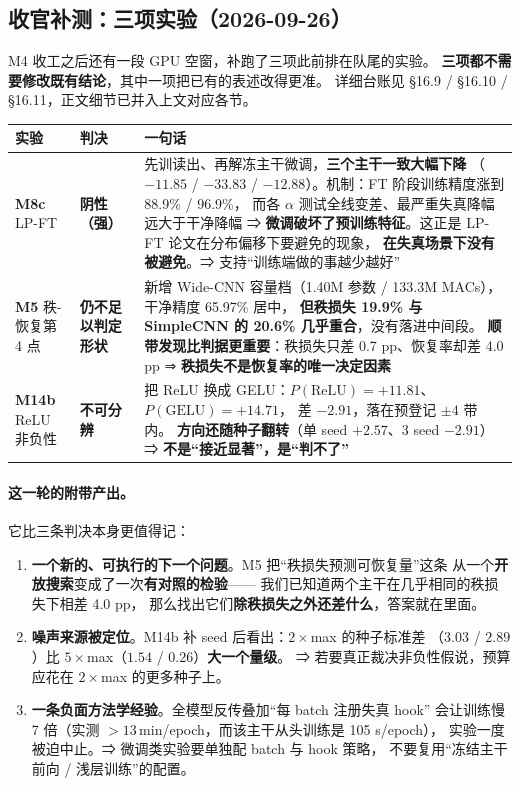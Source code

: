 \documentclass[11pt,a4paper]{ctexart}
\begin{document}
\subsection{收官补测：三项实验（2026-09-26）}

M4 收工之后还有一段 GPU 空窗，补跑了三项此前排在队尾的实验。
\textbf{三项都不需要修改既有结论}，其中一项把已有的表述改得更准。
详细台账见 §16.9 / §16.10 / §16.11，正文细节已并入上文对应各节。

\begin{center}
\small
\begin{tabular}{p{2.3cm}p{2.5cm}p{8.9cm}}
\toprule
实验 & 判决 & 一句话 \\
\midrule
\textbf{M8c} LP-FT
& \textbf{阴性（强）}
& 先训读出、再解冻主干微调，\textbf{三个主干一致大幅下降}
  （$-11.85$ / $-33.83$ / $-12.88$）。机制：FT 阶段训练精度涨到 88.9\% / 96.9\%，
  而各 $\alpha$ 测试全线变差、最严重失真降幅远大于干净降幅
  ⇒ \textbf{微调破坏了预训练特征}。这正是 LP-FT 论文在分布偏移下要避免的现象，
  \textbf{在失真场景下没有被避免}。⇒ 支持“训练端做的事越少越好” \\
\textbf{M5} 秩-恢复第 4 点
& \textbf{仍不足以判定形状}
& 新增 Wide-CNN 容量档（1.40M 参数 / 133.3M MACs），干净精度 65.97\% 居中，
  \textbf{但秩损失 19.9\% 与 SimpleCNN 的 20.6\% 几乎重合}，没有落进中间段。
  \textbf{顺带发现比判据更重要}：秩损失只差 0.7 pp、恢复率却差 4.0 pp
  ⇒ \textbf{秩损失不是恢复率的唯一决定因素} \\
\textbf{M14b} ReLU 非负性
& \textbf{不可分辨}
& 把 ReLU 换成 GELU：$P(\text{ReLU})=+11.81$、$P(\text{GELU})=+14.71$，
  差 $-2.91$，落在预登记 $\pm4$ 带内。
  \textbf{方向还随种子翻转}（单 seed $+2.57$、3 seed $-2.91$）
  ⇒ \textbf{不是“接近显著”，是“判不了”} \\
\bottomrule
\end{tabular}
\end{center}

\paragraph{这一轮的附带产出。}
它比三条判决本身更值得记：

\begin{enumerate}[leftmargin=2em,itemsep=2pt]
  \item \textbf{一个新的、可执行的下一个问题}。M5 把“秩损失预测可恢复量”这条
        从一个\textbf{开放搜索}变成了一次\textbf{有对照的检验}——
        我们已知道两个主干在几乎相同的秩损失下相差 4.0 pp，
        那么找出它们\textbf{除秩损失之外还差什么}，答案就在里面。
  \item \textbf{噪声来源被定位}。M14b 补 seed 后看出：$2\times$max 的种子标准差
        （$3.03$ / $2.89$）比 $5\times$max（$1.54$ / $0.26$）\textbf{大一个量级}。
        ⇒ 若要真正裁决非负性假说，预算应花在 $2\times$max 的更多种子上。
  \item \textbf{一条负面方法学经验}。全模型反传叠加“每 batch 注册失真 hook”
        会让训练慢 7 倍（实测 $>13$\,min/epoch，而该主干从头训练是 105 s/epoch），
        实验一度被迫中止。⇒ 微调类实验要单独配 batch 与 hook 策略，
        不要复用“冻结主干前向 / 浅层训练”的配置。
\end{enumerate}
\end{document}
